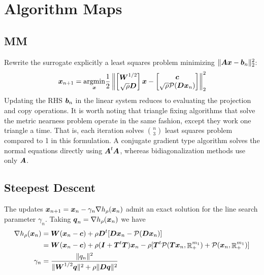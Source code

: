 \documentclass{article}
\begin{document}
\section*{\center Algorithm Maps}

\subsection*{MM}

Rewrite the surrogate explicitly a least squares problem minimizing $\|\boldsymbol{A} \boldsymbol{x} - \boldsymbol{b}_{n}\|^{2}_{2}$:
\begin{equation*}
  \boldsymbol{x}_{n+1} = \underset{\boldsymbol{x}}{\mathop{\rm argmin}\nolimits} \frac{1}{2} \left\|
    \begin{bmatrix}
      \boldsymbol{W}^{1/2} \\
      \sqrt{\rho} \boldsymbol{D}
    \end{bmatrix} \boldsymbol{x}
    -
    \begin{bmatrix}
      \boldsymbol{c} \\
      \sqrt{\rho} \mathcal{P}(\boldsymbol{D} \boldsymbol{x}_{n})
    \end{bmatrix}
  \right\|_{2}^{2}
\end{equation*}
Updating the RHS $\boldsymbol{b}_{n}$ in the linear system reduces to evaluating the projection and copy operations.
It is worth noting that triangle fixing algorithms that solve the metric nearness problem operate in the same fashion, except they work one triangle a time.
That is, each iteration solves $\binom{n}{3}$ least squares problem compared to 1 in this formulation.
A conjugate gradient type algorithm solves the normal equations directly using $\boldsymbol{A}^{t}\boldsymbol{A}$, whereas bidiagonalization methods use only $\boldsymbol{A}$.

\subsection*{Steepest Descent}

The updates $\boldsymbol{x}_{n+1} = \boldsymbol{x}_{n} - \gamma_{n} \nabla h_{\rho}(\boldsymbol{x}_{n})$ admit an exact solution for the line search parameter $\gamma_{n}$.
Taking $\boldsymbol{q}_{n} = \nabla h_{\rho}(\boldsymbol{x}_{n})$ we have
\begin{align*}
  \nabla h_{\rho}(\boldsymbol{x}_{n})
  &= \boldsymbol{W}(\boldsymbol{x}_{n} - \boldsymbol{c}) + \rho \boldsymbol{D}^{t} [\boldsymbol{D} \boldsymbol{x}_{n} - \mathcal{P}(\boldsymbol{D} \boldsymbol{x}_{n})] \\
  &= \boldsymbol{W}(\boldsymbol{x}_{n} - \boldsymbol{c}) + \rho (\boldsymbol{I} + \boldsymbol{T}^{t}\boldsymbol{T}) \boldsymbol{x}_{n} - \rho[\boldsymbol{T}^{t} \mathcal{P}(\boldsymbol{T} \boldsymbol{x}_{n}, \mathop{\mathbb{R}}\nolimits_{+}^{m_{1}}) + \mathcal{P}(\boldsymbol{x}_{n}, \mathop{\mathbb{R}}\nolimits_{+}^{m_{1}})] \\
  \gamma_{n}
  &=
  \frac{\|q_{n}\|^{2}}{\|\boldsymbol{W}^{1/2} \boldsymbol{q}\|^{2} + \rho \|\boldsymbol{D} \boldsymbol{q}\|^{2}}
\end{align*}
\end{document}
